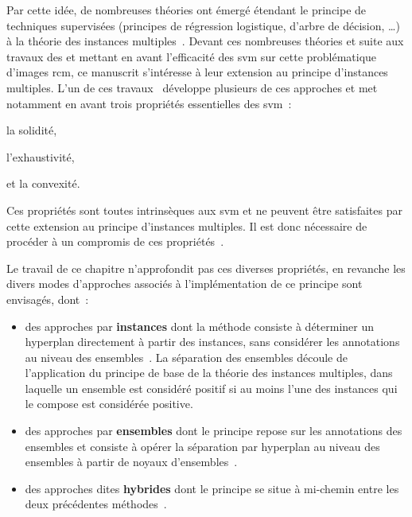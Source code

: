 Par cette idée, de nombreuses théories ont émergé étendant le principe de techniques supervisées (principes de régression logistique, d'arbre de décision, \ldots) à la théorie des instances multiples~\cite{Maron1998,Xu2004,Blockeel2005}. Devant ces nombreuses théories et suite aux travaux des  et  mettant en avant l'efficacité des \gls{svm} sur cette problématique d'images \gls{rcm}, ce manuscrit s'intéresse à leur extension au principe d'instances multiples. L'un de ces travaux~\cite{Doran2014} développe plusieurs de ces approches et met notamment en avant trois propriétés essentielles des \gls{svm}~:
\begin{inlinerate}
    \item la solidité,
    \item l'exhaustivité,
    \item et la convexité.
\end{inlinerate} Ces propriétés sont toutes intrinsèques aux \gls{svm} et ne peuvent être satisfaites par cette extension au principe d'instances multiples. Il est donc nécessaire de procéder à un compromis de ces propriétés~\cite{Doran2014}.\par

Le travail de ce chapitre n'approfondit pas ces diverses propriétés, en revanche les divers modes d'approches associés à l'implémentation de ce principe sont envisagés, dont~: 
\begin{itemize}
    \item des approches par \textbf{instances} dont la méthode consiste à déterminer un hyperplan directement à partir des instances, sans considérer les annotations au niveau des ensembles~\cite{Andrews2003}. La séparation des ensembles découle de l'application du principe de base de la théorie des instances multiples, dans laquelle un ensemble est considéré positif si au moins l'une des instances qui le compose est considérée positive.
    \item des approches par \textbf{ensembles} dont le principe repose sur les annotations des ensembles et consiste à opérer la séparation par hyperplan au niveau des ensembles à partir de noyaux d'ensembles~\cite{Gartner2002}.
    \item des approches dites \textbf{hybrides} dont le principe se situe à mi-chemin entre les deux précédentes méthodes~\cite{Bunescu2007}.
\end{itemize}\par 

